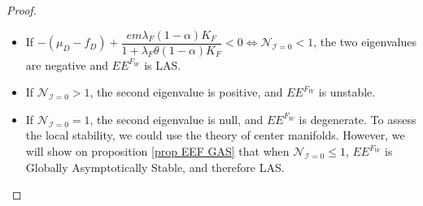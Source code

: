 \documentclass{article}
\newcommand{\lfw}{\lambda_{F}}
\newcommand{\lfw}{\lambda_{F}}
\newcommand{\cI}{\mathcal{I}}
\begin{document}
\begin{proof}
\begin{itemize}
\begin{itemize}
\item If $- (\mu_D-f_D) + \dfrac{em \lfw (1-\alpha)K_F}{1+ \lfw \theta (1-\alpha)K_F} < 0 \Leftrightarrow \mathcal{N}_{\cI = 0} < 1$, the two eigenvalues are negative and $EE^{F_W}$ is LAS.
\item If $\mathcal{N}_{\cI = 0} > 1$, the second eigenvalue is positive, and $EE^{F_W}$ is unstable.
\item If $\mathcal{N}_{\cI = 0} = 1$, the second eigenvalue is null, and $EE^{F_W}$ is degenerate. To assess the local stability, we could use the theory of center manifolds. However, we will show on proposition \ref{prop EEF GAS} that when $\mathcal{N}_{\cI = 0} \leq 1$, $EE^{F_W}$ is Globally Asymptotically Stable, and therefore LAS.
\end{itemize}
%
%
%
%

\end{itemize}
\end{proof}
\end{document}
